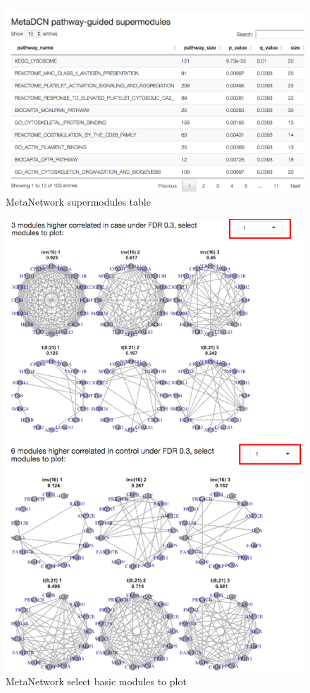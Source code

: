\begin{figure}[H]
\begin{center}
\includegraphics[scale=0.45]{./figure/MetaNetwork/MetaNetworksuper.png}
\caption{MetaNetwork supermodules table}
\label{fig:MetaNetworksuper}
\end{center}
\end{figure}

\begin{figure}[H]
\begin{center}
\includegraphics[scale=0.45]{./figure/MetaNetwork/MetaNetworkBMplot.png}
\caption{MetaNetwork select basic modules to plot}
\label{fig:MetaNetworkBMplot}
\end{center}
\end{figure}
